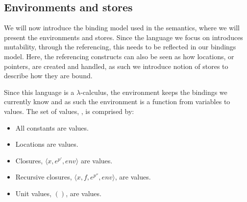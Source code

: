 \documentclass[../../master.tex]{subfiles}
\begin{document}
\iffalse
\begin{definition}[Bound variables]\label{def:bv}
	The set of bound variables is given by:
	\begin{align*}
		bv(x^p)&=\emptyset\\
		bv(c^p)&=\emptyset\\
		bv([\lambda\;y.e_1^{p'}]^p)&=bv(e_1^{p'})\cup\{y\}\\
		bv([e_1^{p'}\;e_2^{p''}]^p)&=bv(e_1^{p'})\cup bv(e_2^{p''})\\
		bv([\mbox{let}\;y\;e_1^{p'}\;e_2^{p''}]^p)&=bv(e_1^{p'})\cup bv(e_2^{p''})\cup\{y\}\\
		bv([\mbox{let rec}\;f\;e_1^{p'}\;e_2^{p''}]^p)&=bv(e_1^{p'})\cup bv(e_2^{p''})\cup\{f\}\\
		bv([\mbox{case}\;e^{p'}\;\pi^{p''}]^p)&=bv(e_1^{p'})\cup bv(\pi)\\
		bv([(s\;e^{p'})\;\pi])&=bv(e^{p'})\cup bv(\pi)\cup\tau(s)\\
		bv([(s\;e^{p'})])&=bv(e^{p'})\cup\tau(s)\\
		bv([\mbox{ref}\;e^{p'}]^p)&=bv(e^{p'})\\
		bv([!e^{p'}]^p)&=bv(e^{p'})\\
		bv([e_1^{p'}\;:=\;e_2^{p''}]^p)&=bv(e_1^{p'})\cup bv(e_2^{p''})\\
	\end{align*}
\end{definition}
\fi

\subsection{Environments and stores}\label{sec:EnvSto}
We will now introduce the binding model used in the semantics, where we will present the environments and stores.
Since the language we focus on introduces mutability, through the referencing, this needs to be reflected in our bindings model.
Here, the referencing constructs can also be seen as how locations, or pointers, are created and handled, as such we introduce notion of stores to describe how they are bound.

Since this language is a $\lambda$-calculus, the environment keeps the bindings we currently know and as such the environment is a function from variables to values.
The set of values, , is comprised by:
\begin{itemize}
	\item All constants are values.
	\item Locations are values.
	\item Closures, $\langle x,e^{p'},env\rangle$ are values.
	\item Recursive closures, $\langle x,f,e^{p''},env\rangle$, are values.
	\item Unit values, $()$, are values.
\end{itemize}
\end{document}
